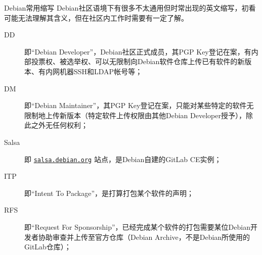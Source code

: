 \begin{frame}{Debian常用缩写}
	Debian社区语境下有很多不太通用但时常出现的英文缩写，初看可能无法理解其含义，但在社区内工作时需要有一定了解。
	\begin{description}
		\item[DD] 即“Debian Developer”，Debian社区正式成员，其PGP Key登记在案，有内部投票权、被选举权、可以无限制向Debian软件仓库上传已有软件的新版本、有内网机器SSH和LDAP帐号等；
		\item[DM] 即“Debian Maintainer”，其PGP Key登记在案，只能对某些特定的软件无限制地上传新版本（特定软件上传权限由其他Debian Developer授予），除此之外无任何权利；
		\item[Salsa] 即 \texttt{\href{https://salsa.debian.org/}{salsa.debian.org}} 站点，是Debian自建的GitLab CE实例；
		\item[ITP] 即“Intent To Package”，是打算打包某个软件的声明；
		\item[RFS] 即“Request For Sponsorship”，已经完成某个软件的打包需要某位Debian开发者协助审查并上传至官方仓库（Debian Archive，不是Debian所使用的GitLab仓库）；
		
	\end{description}
\end{frame}